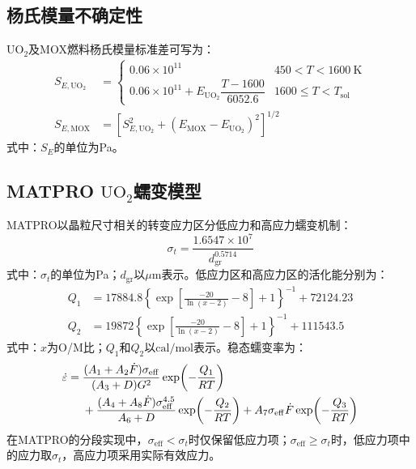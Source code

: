\subsection{杨氏模量不确定性}

$\mathrm{UO}_2$及MOX燃料杨氏模量标准差可写为：
\begin{equation}
	\begin{aligned}
		S_{E,\mathrm{UO}_2}
		&=
		\begin{cases}
			0.06\times10^{11}
			&450<T<1600\ \mathrm{K}\\
			0.06\times10^{11}
			+E_{\mathrm{UO}_2}\dfrac{T-1600}{6052.6}
			&1600\leq T<T_{\mathrm{sol}}
		\end{cases}\\[0.5ex]
		S_{E,\mathrm{MOX}}
		&=
		\left[
		S_{E,\mathrm{UO}_2}^{2}
		+\left(E_{\mathrm{MOX}}-E_{\mathrm{UO}_2}\right)^2
		\right]^{1/2}
	\end{aligned}
	\label{eq:appendix_uo2_youngs_modulus_uncertainty}
\end{equation}
\label{eq:appendix_mox_youngs_modulus_uncertainty}
\noindent 式中：$S_E$的单位为Pa。

\subsection{MATPRO $\mathrm{UO}_2$蠕变模型}

MATPRO以晶粒尺寸相关的转变应力区分低应力和高应力蠕变机制：
\begin{equation}
	\sigma_t=\frac{1.6547\times10^7}{d_{\mathrm{gr}}^{0.5714}}
	\label{eq:appendix_uo2_transition_stress}
\end{equation}
\noindent 式中：$\sigma_t$的单位为Pa；$d_{\mathrm{gr}}$以$\mu\mathrm{m}$表示。低应力区和高应力区的活化能分别为：
\begin{equation}
	\begin{aligned}
		Q_1&=17884.8
		\left\{
		\exp\!\left[\frac{-20}{\ln(x-2)}-8\right]+1
		\right\}^{-1}
		+72124.23
		\\
		Q_2&=19872
		\left\{
		\exp\!\left[\frac{-20}{\ln(x-2)}-8\right]+1
		\right\}^{-1}
		+111543.5
	\end{aligned}
	\label{eq:appendix_uo2_activation_energies}
\end{equation}
\label{eq:appendix_uo2_Q1}
\label{eq:appendix_uo2_Q2}
\noindent 式中：$x$为O/M比；$Q_1$和$Q_2$以$\mathrm{cal/mol}$表示。稳态蠕变率为：
\begin{align}
	\dot{\varepsilon}={}&
	\frac{(A_1+A_2\dot{F})\sigma_{\mathrm{eff}}}
	{(A_3+D)G^2}
	\exp\!\left(-\frac{Q_1}{RT}\right)
	\notag\\
	&+\frac{(A_4+A_8\dot{F})\sigma_{\mathrm{eff}}^{4.5}}
	{A_6+D}
	\exp\!\left(-\frac{Q_2}{RT}\right)
	+A_7\sigma_{\mathrm{eff}}\dot{F}
	\exp\!\left(-\frac{Q_3}{RT}\right)
	\label{eq:appendix_uo2_matpro_creep}
\end{align}
在MATPRO的分段实现中，$\sigma_{\mathrm{eff}}<\sigma_t$时仅保留低应力项；$\sigma_{\mathrm{eff}}\geq\sigma_t$时，低应力项中的应力取$\sigma_t$，高应力项采用实际有效应力。

